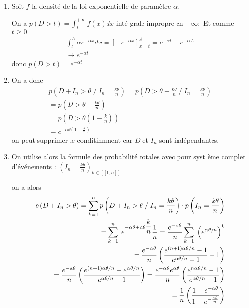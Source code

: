 \documentclass[a4paper, 11pt,reqno]{article}
\begin{document}
\begin{enumerate}
\item Soit $f$ la densit\'{e} de la loi exponentielle de param\`{e}tre $%
\alpha $.

On a $p\left( D>t\right) =\int_{t}^{+\infty }f\left( x\right) dx$ int\'{e}%
grale impropre en $+\infty ;$ Et comme $t\ge 0$%
\begin{eqnarray*}
\int_{t}^{A}\alpha e^{-\alpha x}dx=\left[ -e^{-\alpha x}\right]
_{x=t}^{A}=e^{-\alpha t}-e^{-\alpha A} \\
\rightarrow e^{-\alpha t}
\end{eqnarray*}
donc $p\left( D>t\right) =e^{-\alpha t}$

\item On a donc 
\begin{eqnarray*}
p\left( D+I_{n}>\theta \;/\;I_{n}=\frac{k\theta }{n}\right) =p\left(
D>\theta -\frac{k\theta }{n}\;/\;I_{n}=\frac{k\theta }{n}\right) \\
=p\left( D>\theta -\frac{k\theta }{n}\right) \\
=p\left( D>\theta \left( 1-\frac{k}{n}\right) \right) \\
=e^{-\alpha \theta \left( 1-\displaystyle\frac{k}{n}\right) }
\end{eqnarray*}
on peut supprimer le conditinnment car $D$ et $I_{n}$ sont ind\'{e}pendantes.

\item On utilise alors la formule des probabilit\'{e} totales avec pour syst%
\`{e}me complet d'\'{e}v\'{e}nements : $\displaystyle
\left( I_{n}=\frac{k\theta }{n}\right) _{k\in \left[ \left[ 1,n\right] %
\right] }$

on a alors 
\begin{eqnarray*}
p\left( D+I_{n}>\theta \right) =\sum_{k=1}^{n}p\left( D+I_{n}>\theta
\;/\;I_{n}=\frac{k\theta }{n}\right) \cdot p\left( I_{n}=\frac{k\theta }{n}%
\right) \\
=\sum_{k=1}^{n}\;e^{-\alpha \theta +\alpha \theta \displaystyle\frac{k}{n}}%
\frac{1}{n}=\frac{e^{-\alpha \theta }}{n}\sum_{k=1}^{n}\;\left( e^{\alpha
\theta /n}\right) ^{k} \\
=\frac{e^{-\alpha \theta }}{n}\left( \frac{e^{\left( n+1\right) \alpha
\theta /n}-1}{e^{\alpha \theta /n}-1}-1\right) \\
=\frac{e^{-\alpha \theta }}{n}\left( \frac{e^{\left( n+1\right) \alpha
\theta /n}-e^{\alpha \theta /n}}{e^{\alpha \theta /n}-1}\right) =\frac{%
e^{-\alpha \theta }e^{\alpha \theta }}{n}\left( \frac{e^{n\alpha \theta /n}-1%
}{e^{\alpha \theta /n}-1}\right) \\
=\frac{1}{n}\left( \frac{\displaystyle 1-e^{-\alpha \theta }}{\displaystyle %
1-e^{-\frac{\alpha \theta }{n}}}\right)
\end{eqnarray*}


\end{enumerate}
\end{document}

